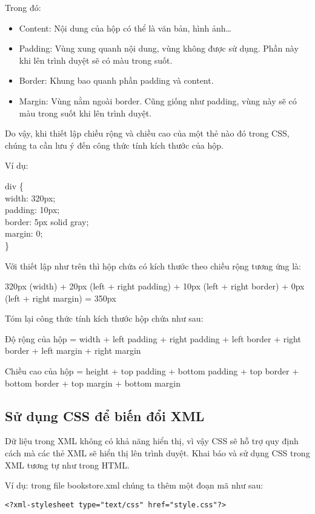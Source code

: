 Trong đó:
\begin{itemize}
\item 	Content: Nội dung của hộp có thể là văn bản, hình ảnh…
\item 	Padding: Vùng xung quanh nội dung, vùng không được sử dụng. Phần này khi lên trình duyệt sẽ có màu trong suốt.
\item 	Border: Khung bao quanh phần padding và content.
\item 	Margin: Vùng nằm ngoài border. Cũng giống như padding, vùng này sẽ có màu trong suốt khi lên trình duyệt.
\end{itemize}

Do vậy, khi thiết lập chiều rộng và chiều cao của một thẻ nào đó trong CSS, chúng ta cần lưu ý đến công thức tính kích thước của hộp. 

Ví dụ: 

{\ttfamily
div \{ \\
 \indent \indent  width: 320px; \\
 \indent \indent padding: 10px; \\
  \indent \indent border: 5px solid gray; \\
   \indent \indent margin: 0;  \\
 \indent  \}
}

Với thiết lập như trên thì hộp chứa có kích thước theo chiều rộng tương ứng là:

{\ttfamily
320px (width) + 20px (left + right padding) + 10px (left + right border) + 0px (left + right margin) = 350px
}

Tóm lại công thức tính kích thước hộp chứa như sau:

{\ttfamily
Độ rộng của hộp = width + left padding + right padding + left border + right border + left margin + right margin

Chiều cao của hộp = height + top padding + bottom padding + top border + bottom border + top margin + bottom margin
}

\subsection {Sử dụng CSS để biến đổi XML}
Dữ liệu trong XML không có khả năng hiển thị, vì vậy CSS sẽ hỗ trợ quy định cách mà các thẻ XML sẽ hiển thị lên trình duyệt. Khai báo và sử dụng CSS trong XML tương tự như trong HTML.

Ví dụ: trong file bookstore.xml chúng ta thêm một đoạn mã như sau:
\lstset{language=XML}
\begin{lstlisting}[escapechar=`]
	<?xml-stylesheet type="text/css" href="style.css"?>
\end{lstlisting}

